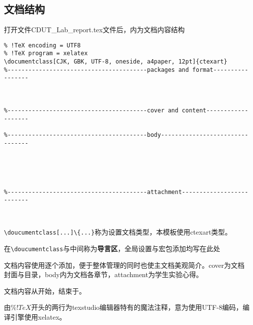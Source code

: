\subsection{文档结构}
打开文件CDUT\_Lab\_report.tex文件后，内为文档内容结构
\begin{verbatim}
% !TeX encoding = UTF8
% !TeX program = xelatex
\documentclass[CJK, GBK, UTF-8, oneside, a4paper, 12pt]{ctexart}
%----------------------------------------packages and format-----------------



%----------------------------------------cover and content-------------------

%----------------------------------------body--------------------------------





%----------------------------------------attachment--------------------------



\end{verbatim}

\verb|\doucumentclass[...]\{...}|称为设置文档类型，本模板使用ctexart类型。

在\verb|\doucumentclass|与\verb||中间称为\textbf{导言区}，全局设置与宏包添加均写在此处

文档内容使用\verb||逐个添加，便于整体管理的同时也使主文档美观简介。cover为文档封面与目录，body内为文档各章节，attachment为学生实验心得。

文档内容从\verb||开始，结束于\verb||。

由$\% !TeX$开头的两行为texstudio编辑器特有的魔法注释，意为使用UTF-8编码，编译引擎使用xelatex。